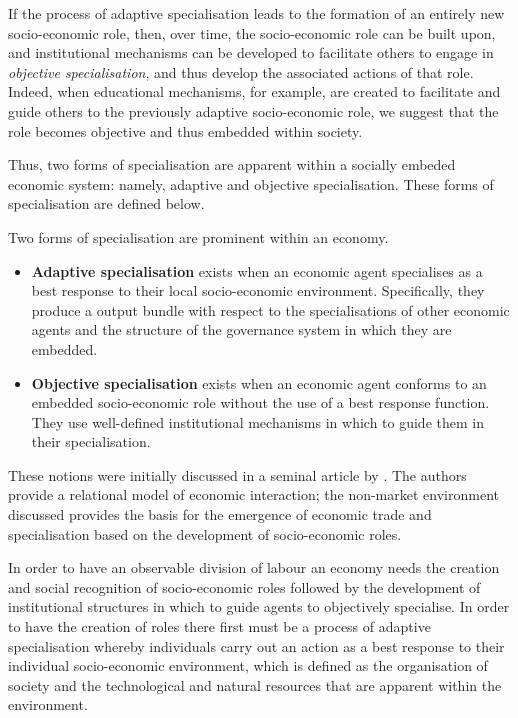 If the process of adaptive specialisation leads to the formation of an entirely new socio-economic role, then, over time, the socio-economic role can be built upon, and institutional mechanisms can be developed to facilitate others to engage in \emph{objective specialisation}, and thus develop the associated actions of that role. Indeed, when educational mechanisms, for example, are created to facilitate and guide others to the previously adaptive socio-economic role, we suggest that the role becomes objective and thus embedded within society.

Thus, two forms of specialisation are apparent within a socially embeded economic system: namely, adaptive and objective specialisation. These forms of specialisation are defined below.
\begin{definition} \label{formsofspec}
Two forms of specialisation are prominent within an economy.
\begin{itemize}
\item \textbf{Adaptive specialisation} exists when an economic agent specialises as a best response to their local socio-economic environment. Specifically, they produce a output bundle with respect to the specialisations of other economic agents and the structure of the governance system in which they are embedded.

\item \textbf{Objective specialisation} exists when an economic agent conforms to an embedded socio-economic role without the use of a best response function. They use well-defined institutional mechanisms in which to guide them in their specialisation.
\end{itemize}
\end{definition}
These notions were initially discussed in a seminal article by \citet{GillesLazarovaRuys2007}. The authors provide a relational model of economic interaction; the non-market environment discussed provides the basis for the emergence of economic trade and specialisation based on the development of socio-economic roles.

In order to have an observable division of labour an economy needs the creation and social recognition of socio-economic roles followed by the development of institutional structures in which to guide agents to objectively specialise. In order to have the creation of roles there first must be a process of adaptive specialisation whereby individuals carry out an action as a best response to their individual socio-economic environment, which is defined as the organisation of society and the technological and natural resources that are apparent within the environment. 

